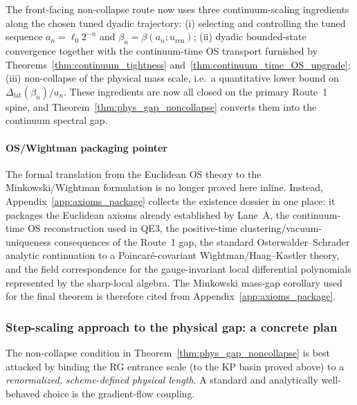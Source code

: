 \begin{remark}
The front-facing non-collapse route now uses three continuum-scaling ingredients along the chosen tuned dyadic trajectory:
(i) selecting and controlling the tuned sequence $a_n=\ell_0 2^{-n}$ and $\beta_n=\beta(a_n;u_{\mathrm{ren}})$;
(ii) dyadic bounded-state convergence together with the continuum-time OS transport furnished by Theorems~\ref{thm:continuum_tightness} and~\ref{thm:continuum_time_OS_upgrade};
(iii) non-collapse of the physical mass scale, i.e.\ a quantitative lower bound on $\Delta_{\mathrm{lat}}(\beta_n)/a_n$.
These ingredients are now all closed on the primary Route~1 spine, and Theorem~\ref{thm:phys_gap_noncollapse} converts them into the continuum spectral gap.
\end{remark}


\paragraph*{OS/Wightman packaging pointer}
The formal translation from the Euclidean OS theory to the Minkowski/Wightman formulation is no longer proved here inline.
Instead, Appendix~\ref{app:axioms_package} collects the existence dossier in one place: it packages the Euclidean axioms already established by Lane~A, the continuum-time OS reconstruction used in QE3, the positive-time clustering/vacuum-uniqueness consequences of the Route~1 gap, the standard Osterwalder--Schrader analytic continuation to a Poincar\'e-covariant Wightman/Haag--Kastler theory, and the field correspondence for the gauge-invariant local differential polynomials represented by the sharp-local algebra.
The Minkowski mass-gap corollary used for the final theorem is therefore cited from Appendix~\ref{app:axioms_package}.


\subsubsection{Step-scaling approach to the physical gap: a concrete plan}
The non-collapse condition in Theorem~\ref{thm:phys_gap_noncollapse} is best attacked by binding the RG entrance scale
(to the KP basin proved above) to a \emph{renormalized, scheme-defined physical length}.
A standard and analytically well-behaved choice is the gradient-flow coupling.

